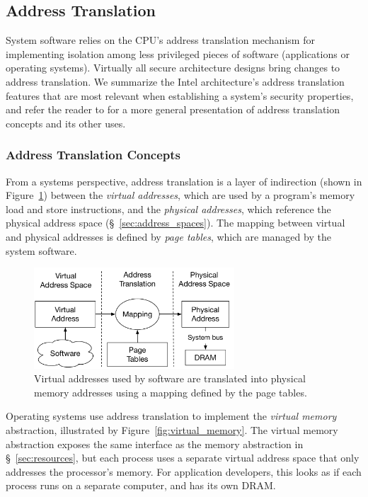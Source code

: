 \subsection{Address Translation}
\label{sec:paging}


System software relies on the CPU's address translation mechanism for
implementing isolation among less privileged pieces of software (applications
or operating systems). Virtually all secure architecture designs bring changes
to address translation. We summarize the Intel architecture's address
translation features that are most relevant when establishing a system's
security properties, and refer the reader to \cite{jacob1998virtual} for a more
general presentation of address translation concepts and its other uses.


\subsubsection{Address Translation Concepts}

From a systems perspective, address translation is a layer of indirection
(shown in Figure~\ref{fig:address_translation}) between the
\textit{virtual addresses}, which are used by a program's memory load and store
instructions, and the \textit{physical addresses}, which reference the physical
address space (\S~\ref{sec:address_spaces}). The mapping between virtual and
physical addresses is defined by \textit{page tables}, which are managed by the
system software.

\begin{figure}[hbt]
  \centering
  \includegraphics[width=75mm]{figures/address_translation.pdf}
  \caption{
    Virtual addresses used by software are translated into physical memory
    addresses using a mapping defined by the page tables.
  }
  \label{fig:address_translation}
\end{figure}

Operating systems use address translation to implement the \textit{virtual
memory} abstraction, illustrated by Figure~\ref{fig:virtual_memory}. The
virtual memory abstraction exposes the same interface as the memory abstraction
in \S~\ref{sec:resources}, but each process uses a separate virtual address
space that only addresses the processor's memory. For application developers,
this looks as if each process runs on a separate computer, and has its own
DRAM.

